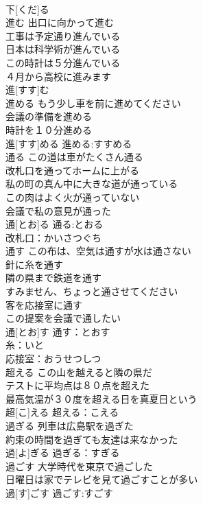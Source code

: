 \documentclass[8pt]{extreport}
\begin{document}
\begin{CJK}{UTF8}{min}
\\	下[くだ]る						
\\	進む	出口に向かって進む 
\\	工事は予定通り進んでいる 
\\	日本は科学術が進んでいる 
\\	この時計は５分進んでいる 
\\	４月から高校に進みます 
\\	進[すす]む						
\\	進める	もう少し車を前に進めてください 
\\	会議の準備を進める 
\\	時計を１０分進める 
\\	進[すす]める			進める:すすめる
\\	通る	この道は車がたくさん通る 
\\	改札口を通ってホームに上がる 
\\	私の町の真ん中に大きな道が通っている 
\\	この肉はよく火が通っていない 
\\	会議で私の意見が通った 
\\	通[とお]る			通る:とおる
\\	改札口：かいさつぐち
\\	通す	この布は、空気は通すが水は通さない 
\\	針に糸を通す 
\\	隣の県まで鉄道を通す 
\\	すみません、ちょっと通させてください 
\\	客を応接室に通す 
\\	この提案を会議で通したい 
\\	通[とお]す			通す：とおす
\\	糸：いと
\\	応接室：おうせつしつ
\\	超える	この山を越えると隣の県だ 
\\	テストに平均点は８０点を超えた 
\\	最高気温が３０度を超える日を真夏日という 
\\	超[こ]える			超える：こえる
\\	過ぎる	列車は広島駅を過ぎた 
\\	約束の時間を過ぎても友達は来なかった 
\\	過[よ]ぎる			過ぎる：すぎる
\\	過ごす	大学時代を東京で過ごした 
\\	日曜日は家でテレビを見て過ごすことが多い 
\\	過[す]ごす			過ごす:すごす

\end{CJK}
\end{document}
